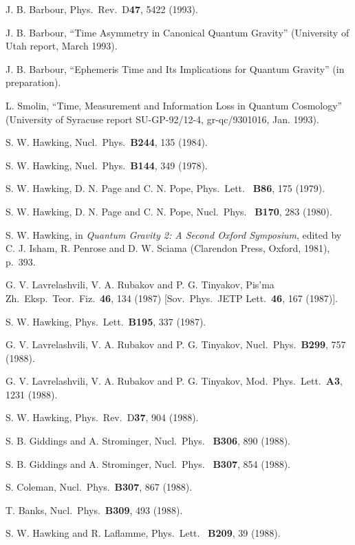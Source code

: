 \documentclass[12pt]{article}
\begin{document}
\begin{thebibliography}{999}
 J. B. Barbour, Phys.\ Rev.\ D{\bf 47}, 5422 (1993).

 J. B. Barbour, ``Time Asymmetry in Canonical Quantum
Gravity''
(University of Utah report, March 1993).

 J. B. Barbour, ``Ephemeris Time and Its Implications
for
Quantum
Gravity'' (in preparation).

 L. Smolin, ``Time, Measurement and Information Loss in
Quantum
Cosmology'' (University of Syracuse report SU-GP-92/12-4,
gr-qc/9301016, Jan.
1993).

 S. W. Hawking, Nucl.\ Phys.\ {\bf B244}, 135 (1984).

 S. W. Hawking, Nucl.\ Phys.\ {\bf B144}, 349 (1978).

 S. W. Hawking, D. N. Page and C. N. Pope, Phys.\ Lett.\
{\bf
B86},
175 (1979).

 S. W. Hawking, D. N. Page and C. N. Pope, Nucl.\ Phys.\
{\bf
B170}, 283 (1980).

 S. W. Hawking, in {\em Quantum Gravity 2:  A Second
Oxford
Symposium}, edited by C. J. Isham, R. Penrose and D. W. Sciama
(Clarendon
Press, Oxford, 1981), p.~393.

 G. V. Lavrelashvili, V. A. Rubakov and P. G. Tinyakov,
Pis'ma
Zh.\
Eksp.\ Teor.\ Fiz.\ {\bf 46}, 134 (1987) [Sov.\ Phys.\ JETP Lett.\
{\bf 46},
167 (1987)].

\bibitem{w4} S. W. Hawking, Phys.\ Lett.\ {\bf B195}, 337 (1987).

\bibitem{w5} G. V. Lavrelashvili, V. A. Rubakov and P. G. Tinyakov,
Nucl.\
Phys.\ {\bf B299}, 757 (1988).

 G. V. Lavrelashvili, V. A. Rubakov and P. G. Tinyakov,
Mod.\
Phys.\ Lett.\ {\bf A3}, 1231 (1988).

\bibitem{w6} S. W. Hawking, Phys.\ Rev.\ D{\bf 37}, 904 (1988).

\bibitem{w7a} S. B. Giddings and A. Strominger, Nucl.\ Phys.\ {\bf
B306}, 890
(1988).

\bibitem{w7} S. B. Giddings and A. Strominger, Nucl.\ Phys.\ {\bf
B307}, 854
(1988).

 S. Coleman, Nucl.\ Phys.\ {\bf B307}, 867 (1988).

\bibitem{w9} T. Banks, Nucl.\ Phys.\ {\bf B309}, 493 (1988).

 S. W. Hawking and R. Laflamme, Phys.\ Lett.\ {\bf
B209}, 39
(1988).


\end{thebibliography}
\end{document}
